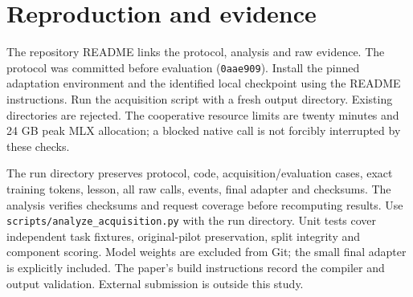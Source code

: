 \documentclass[11pt]{article}
\begin{document}
\section{Reproduction and evidence}
The repository README links the protocol, analysis and raw evidence. The protocol was committed before evaluation (\texttt{0aae909}). Install the pinned adaptation environment and the identified local checkpoint using the README instructions. Run the acquisition script with a fresh output directory. Existing directories are rejected. The cooperative resource limits are twenty minutes and 24 GB peak MLX allocation; a blocked native call is not forcibly interrupted by these checks.

The run directory preserves protocol, code, acquisition/evaluation cases, exact training tokens, lesson, all raw calls, events, final adapter and checksums. The analysis verifies checksums and request coverage before recomputing results. Use \texttt{scripts/analyze\_acquisition.py} with the run directory. Unit tests cover independent task fixtures, original-pilot preservation, split integrity and component scoring. Model weights are excluded from Git; the small final adapter is explicitly included. The paper's build instructions record the compiler and output validation. External submission is outside this study.



\end{document}
